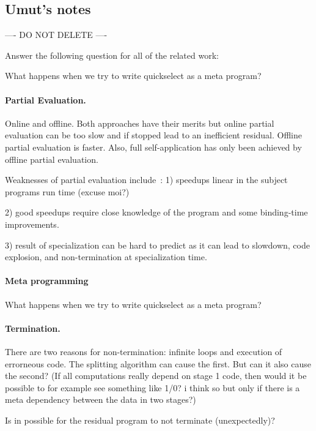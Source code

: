 \subsection{Umut's notes}

---- DO NOT DELETE ----


Answer the following question for all of the related work:

What happens when we try to write quickselect as a meta program? 


\paragraph{Partial Evaluation.}
Online and offline.  Both approaches have their merits but online
partial evaluation can be too slow and if stopped lead to an
inefficient residual.  Offline partial evaluation is faster.  Also,
full self-application has only been achieved by offline partial
evaluation.


Weaknesses of partial evaluation include~\cite{GJ05}:
1) speedups linear in the subject programs run time (excuse moi?)

2) good speedups require close knowledge of the program and some
binding-time improvements.

3) result of specialization can be hard to predict as it can lead to
slowdown, code explosion, and non-termination at specialization time.


\paragraph{Meta programming}

What happens when we try to write quickselect as a meta program? 


\paragraph{Termination.}

There are two reasons for non-termination: infinite loops and
execution of errorneous code.  The splitting algorithm can cause the
first.  But can it also cause the second? (If all computations really
depend on stage 1 code, then would it be possible to for example see
something like 1/0?  i think so but only if there is a meta dependency
between the data in two stages?)


Is in possible for the residual program to not terminate (unexpectedly)? 

